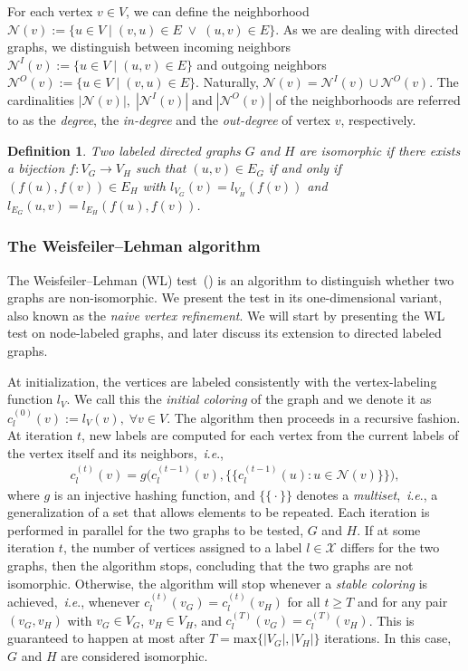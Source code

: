 \documentclass{article} \usepackage{iclr2019_conference,times}
\newtheorem{definition}{Definition}[section]
\newcommand{\ie}{\textit{i}.\textit{e}., }
\begin{document}
For each vertex $v \in V$, we can define the neighborhood $\mathcal{N}(v) := \{u \in V \; | \; (v,u) \in E \; \vee \; (u,v) \in E\}$. As we are dealing with directed graphs, we distinguish between incoming neighbors $\mathcal{N}^I(v) := \{u \in V \; | \; (u,v) \in E\}$ and outgoing neighbors $\mathcal{N}^O(v) := \{u \in V \; | \; (v,u) \in E\}$. Naturally, $\mathcal{N}(v) = \mathcal{N}^I(v) \cup \mathcal{N}^O(v)$. The cardinalities $|\mathcal{N}(v)|, \; |\mathcal{N}^I(v)| \; \mathrm{and} \; |\mathcal{N}^O(v)|$ of the neighborhoods are referred to as the \emph{degree}, the \emph{in-degree} and the \emph{out-degree} of vertex $v$, respectively.

\begin{definition}
Two labeled directed graphs $G$ and $H$ are \emph{isomorphic} if there exists a bijection $f: V_G \rightarrow V_H$ such that $(u, v) \in E_G$ if and only if $(f(u), f(v)) \in E_H$ with $l_{V_G}(v) = l_{V_H}(f(v))$ and $l_{E_G}(u, v) = l_{E_H}(f(u), f(v))$. 
\end{definition} 

\subsubsection{The Weisfeiler--Lehman algorithm}\label{sec:wl_test}

The Weisfeiler--Lehman (WL) test~(\cite{Weisfeiler1968}) is an algorithm to distinguish whether two graphs are non-isomorphic. We present the test in its one-dimensional variant, also known as the \emph{naive vertex refinement}. We will start by presenting the WL test on node-labeled graphs, and later discuss its extension to directed labeled graphs. 

At initialization, the vertices are labeled consistently with the vertex-labeling function $l_V$. We call this the \emph{initial coloring} of the graph and we denote it as $c_l^{(0)}(v) := l_V(v), \; \forall v \in V$. The algorithm then proceeds in a recursive fashion. At iteration $t$, new labels are computed for each vertex from the current labels of the vertex itself and its neighbors,~\ie
\begin{align}\label{eq:wl_iteration}
    c_l^{(t)}(v) = g\Big(c_l^{(t-1)}(v), \big\{\big\{ c_l^{(t-1)}(u): u \in \mathcal{N}(v) \big\}\big\}\Big),
\end{align}
where $g$ is an injective hashing function, and $\big\{\big\{\cdot\big\}\big\}$ denotes a \emph{multiset},~\ie a generalization of a set that allows elements to be repeated.
Each iteration is performed in parallel for the two graphs to be tested, $G$ and $H$. If at some iteration $t$, the number of vertices assigned to a label $l \in \mathcal{X}$ differs for the two graphs, then the algorithm stops, concluding that the two graphs are not isomorphic. Otherwise, the algorithm will stop whenever a \emph{stable coloring} is achieved,~\ie whenever $c_l^{(t)}(v_G) = c_l^{(t)}(v_H)$ for all $t \geq T$ and for any pair $(v_G, v_H)$ with $v_G \in V_G$, $v_H \in V_H$, and $c_l^{(T)}(v_G) = c_l^{(T)}(v_H)$.
This is guaranteed to happen at most after $T=\mathrm{max}\{|V_G|,|V_H|\}$ iterations.
In this case, $G$ and $H$ are considered isomorphic. 
\end{document}
